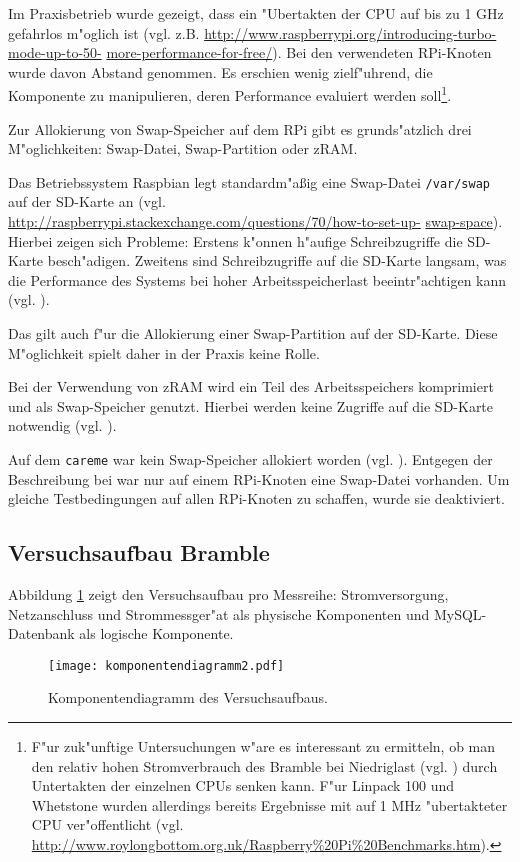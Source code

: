 Im Praxisbetrieb wurde gezeigt, dass ein "Ubertakten der CPU auf bis zu 1 GHz gefahrlos m"oglich ist (vgl. z.B. \url{http://www.raspberrypi.org/introducing-turbo-mode-up-to-50-} \url{more-performance-for-free/}). Bei den verwendeten RPi-Knoten wurde davon Abstand genommen. Es erschien wenig zielf"uhrend, die Komponente zu manipulieren, deren Performance evaluiert werden soll\footnote{F"ur zuk"unftige Untersuchungen w"are es interessant zu ermitteln, ob man den relativ hohen Stromverbrauch des Bramble bei Niedriglast (vgl. \cite{kli13}) durch Untertakten der einzelnen CPUs senken kann. F"ur Linpack 100 und Whetstone wurden allerdings bereits Ergebnisse mit auf 1 MHz "ubertakteter CPU ver"offentlicht (vgl. \url{http://www.roylongbottom.org.uk/Raspberry\%20Pi\%20Benchmarks.htm}).}.

Zur Allokierung von Swap-Speicher auf dem RPi gibt es grunds"atzlich drei M"oglichkeiten: Swap-Datei, Swap-Partition oder zRAM. 

\noindent
Das Betriebssystem Raspbian legt standardm"a\ss ig eine Swap-Datei \texttt{/var/swap} auf der SD-Karte an (vgl. \url{http://raspberrypi.stackexchange.com/questions/70/how-to-set-up-} \url{swap-space}). Hierbei zeigen sich Probleme: Erstens k"onnen h"aufige Schreibzugriffe die SD-Karte besch"adigen. Zweitens sind Schreibzugriffe auf die SD-Karte langsam, was die Performance des Systems bei hoher Arbeitsspeicherlast beeintr"achtigen kann (vgl. \cite{pow12}). 

Das gilt auch f"ur die Allokierung einer Swap-Partition auf der SD-Karte. Diese M"oglichkeit spielt daher in der Praxis keine Rolle. 

Bei der Verwendung von zRAM wird ein Teil des Arbeitsspeichers komprimiert und als Swap-Speicher genutzt. Hierbei werden keine Zugriffe auf die SD-Karte notwendig (vgl. \cite{pow12}). 

Auf dem \texttt{careme} war kein Swap-Speicher allokiert worden (vgl. \cite{kli13}). Entgegen der Beschreibung bei war nur auf einem RPi-Knoten eine Swap-Datei vorhanden. Um gleiche Testbedingungen auf allen RPi-Knoten zu schaffen, wurde sie deaktiviert. 

\subsection{Versuchsaufbau Bramble}\label{Bramble-Versuchsaufbau}

Abbildung \ref{fig:Komponentendiagramm} zeigt den Versuchsaufbau pro Messreihe: Stromversorgung, Netzanschluss und Strommessger"at als physische Komponenten und MySQL-Datenbank als logische Komponente. 
\begin{figure}[htb]
  \centering
  \centerline{\texttt{[image: komponentendiagramm2.pdf]}} 
  \caption{Komponentendiagramm des Versuchsaufbaus.}
  \label{fig:Komponentendiagramm}		
\end{figure}
